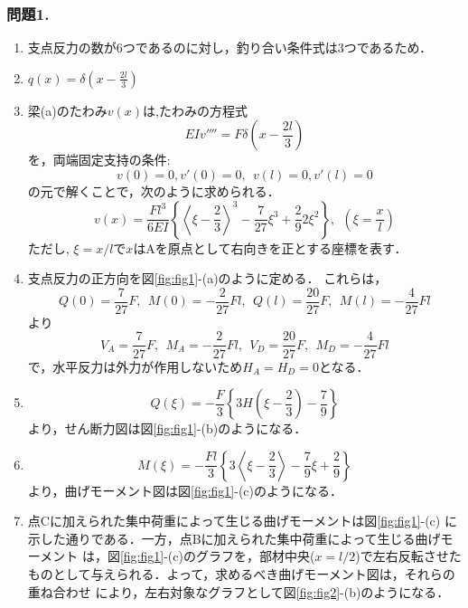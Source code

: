 ﻿\documentclass[10pt,a4j]{jarticle}
\begin{document}
\subsubsection*{問題1.}
\begin{enumerate}
\item
	支点反力の数が6つであるのに対し，釣り合い条件式は3つであるため．
\item
	$q(x)=\delta\left(x-\frac{2l}{3}\right)$
\item
	梁(a)のたわみ$v(x)$は,たわみの方程式
	\begin{equation}
		EIv''''=F\delta\left(x-\frac{2l}{3}\right)
	\end{equation}
	を，両端固定支持の条件:
	\begin{equation}
		v(0)=0, v'(0)=0, \ \
		v(l)=0, v'(l)=0
	\end{equation}
の元で解くことで，次のように求められる．
\begin{equation}
	v(x)=
	\frac{Fl^3}{6EI}
	\left\{ \left<\xi -\frac{2}{3}\right>^3-\frac{7}{27}\xi^3+\frac{2}{9}2\xi^2 \right\}, 
	\ \ \left(\xi=\frac{x}{l}\right)
	\label{eqn:vx}
\end{equation}
ただし, $\xi=x/l$で$x$はAを原点として右向きを正とする座標を表す．
\item
	支点反力の正方向を図\ref{fig:fig1}-(a)のように定める．
	これらは，
	\begin{equation}
		Q(0)=\frac{7}{27}F, \ \ M(0)=-\frac{2}{27}Fl, \ \ 
		Q(l)=\frac{20}{27}F, \ \ M(l)=-\frac{4}{27}Fl
	\end{equation}
	より
	\begin{equation}
		V_A=\frac{7}{27}F, \ \ M_A=-\frac{2}{27}Fl, \ \ 
		V_D=\frac{20}{27}F, \ \ M_D=-\frac{4}{27}Fl
	\end{equation}
	で，水平反力は外力が作用しないため$H_A=H_D=0$となる．
\item
	\begin{equation}
		Q(\xi)=-\frac{F}{3}
		\left\{ 
			3H\left( \xi-\frac{2}{3}\right) -\frac{7}{9}
		\right\}
	\end{equation}
	より，せん断力図は図\ref{fig:fig1}-(b)のようになる．
\item
	\begin{equation}
		M(\xi)=-\frac{Fl}{3}
		\left\{ 
			3\left< \xi-\frac{2}{3}\right> -\frac{7}{9}\xi+\frac{2}{9}
		\right\}
	\end{equation}
	より，曲げモーメント図は図\ref{fig:fig1}-(c)のようになる．
\item
	点Cに加えられた集中荷重によって生じる曲げモーメントは図\ref{fig:fig1}-(c)
	に示した通りである．一方，点Bに加えられた集中荷重によって生じる曲げモーメント
	は，図\ref{fig:fig1}-(c)のグラフを，部材中央($x=l/2$)で左右反転させた
	ものとして与えられる．よって，求めるべき曲げモーメント図は，それらの重ね合わせ
	により，左右対象なグラフとして図\ref{fig:fig2}-(b)のようになる．
\end{enumerate}
\end{document}
